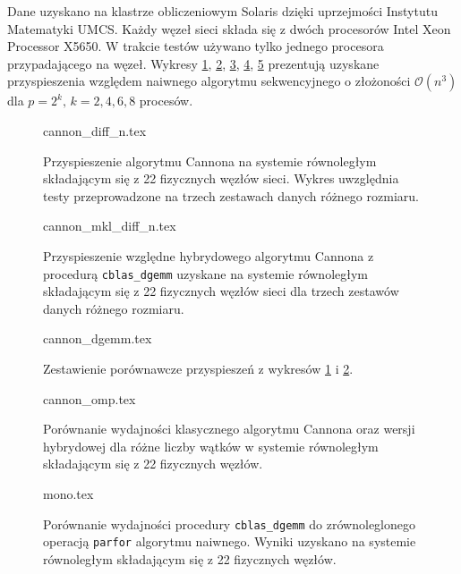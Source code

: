 Dane uzyskano na klastrze obliczeniowym Solaris dzięki uprzejmości Instytutu Matematyki UMCS. Każdy węzeł sieci składa się z dwóch procesorów Intel Xeon Processor X5650. W trakcie testów używano tylko jednego procesora przypadającego na węzeł. Wykresy \ref{pl:cannon_seq_diff}, \ref{pl:cannon_dgemm_diff}, \ref{pl:compar_dgemm}, \ref{pl:cannon_omp}, \ref{pl:mono} prezentują uzyskane przyspieszenia względem naiwnego algorytmu sekwencyjnego o złożoności \(\mathcal{O}(n^3)\) dla \(p=2^k,\,k=2,4,6,8\) procesów.

\begin{figure}[hb]
\centering
\footnotesize
{cannon_diff_n.tex}
\caption{Przyspieszenie algorytmu Cannona na systemie równoległym składającym się z 22 fizycznych węzłów sieci. Wykres uwzględnia testy przeprowadzone na trzech zestawach danych różnego rozmiaru.}
\label{pl:cannon_seq_diff}
\end{figure}

\begin{figure}[hb]
\centering
\footnotesize
{cannon_mkl_diff_n.tex}
\caption{Przyspieszenie względne hybrydowego algorytmu Cannona z procedurą \texttt{cblas\_dgemm} uzyskane na systemie równoległym składającym się z 22 fizycznych węzłów sieci dla trzech zestawów danych różnego rozmiaru.}
\label{pl:cannon_dgemm_diff}
\end{figure}

\begin{figure}[hb]
\centering
\footnotesize
{cannon_dgemm.tex}
\caption{Zestawienie porównawcze przyspieszeń z wykresów \ref{pl:cannon_seq_diff} i \ref{pl:cannon_dgemm_diff}.} 
\label{pl:compar_dgemm}
\end{figure}

\begin{figure}[hb]
\centering
\footnotesize
{cannon_omp.tex}
\caption{Porównanie wydajności klasycznego algorytmu Cannona oraz wersji hybrydowej dla różne liczby wątków w systemie równoległym składającym się z 22 fizycznych węzłów.}
\label{pl:cannon_omp}
\end{figure}

\begin{figure}[hb]
\centering
\footnotesize
{mono.tex}
\caption{Porównanie wydajności procedury \texttt{cblas\_dgemm} do zrównoleglonego operacją \texttt{parfor} algorytmu naiwnego. Wyniki uzyskano na systemie równoległym składającym się z 22 fizycznych węzłów.}
\label{pl:mono}
\end{figure}

